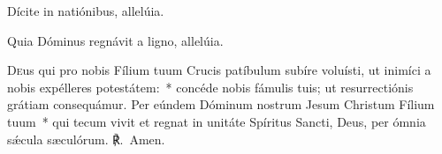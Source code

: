 \vv Dícite in natiónibus, allelúia.

\rr Quia Dóminus regnávit a ligno, allelúia.


\lettrine{D}{e}us qui pro nobis Fílium tuum Crucis patíbulum subíre voluísti, ut inimíci a nobis expélleres potestátem:~* concéde nobis fámulis tuis; ut resurrectiónis grátiam consequámur. Per eúndem Dóminum nostrum Jesum Christum Fílium tuum~* qui tecum vivit et regnat in unitáte Spíritus Sancti, Deus, per ómnia sǽcula sæculórum. ℟.~Amen.